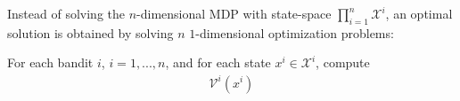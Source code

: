 \documentclass[11pt]{elegantbook}
\begin{document}
Instead of solving the $n$-dimensional MDP with state-space $\prod_{i=1}^n \mathcal{X}^i$, an optimal solution is obtained by solving $n$ $1$-dimensional
optimization problems:
\begin{definition}
    For each bandit $i$,
    $i = 1,..., n$, and for each state $x^i\in \mathcal{X}^i$, compute
    \begin{equation}
        \begin{aligned}
            \mathcal{V}^i(x^i)
        \end{aligned}
        \nonumber
    \end{equation}
\end{definition}
\end{document}
